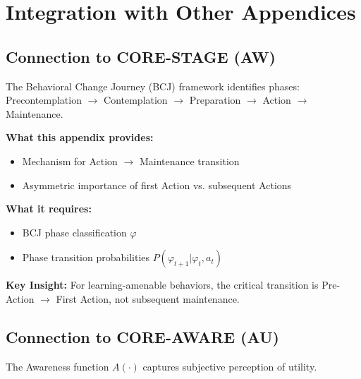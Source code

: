 \section{Integration with Other Appendices}
\label{sec:hf-integration}

\subsection{Connection to CORE-STAGE (AW)}

The Behavioral Change Journey (BCJ) framework identifies phases:
Precontemplation $\rightarrow$ Contemplation $\rightarrow$ Preparation $\rightarrow$ Action $\rightarrow$ Maintenance.

\begin{tcolorbox}[colback=yellow!5!white, colframe=yellow!75!black,
    title=Integration: PREDICT-HABIT $\leftrightarrow$ CORE-STAGE]
\textbf{What this appendix provides:}
\begin{itemize}[nosep]
\item Mechanism for Action $\rightarrow$ Maintenance transition
\item Asymmetric importance of first Action vs. subsequent Actions
\end{itemize}

\textbf{What it requires:}
\begin{itemize}[nosep]
\item BCJ phase classification $\varphi$
\item Phase transition probabilities $P(\varphi_{t+1} | \varphi_t, a_t)$
\end{itemize}

\textbf{Key Insight:} For learning-amenable behaviors, the critical transition is
Pre-Action $\rightarrow$ First Action, not subsequent maintenance.
\end{tcolorbox}

\subsection{Connection to CORE-AWARE (AU)}

The Awareness function $A(\cdot)$ captures subjective perception of utility.

